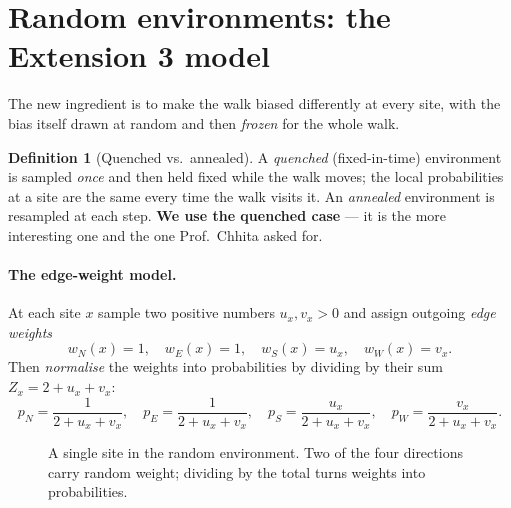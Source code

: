 \documentclass[11pt]{article}
\theoremstyle{definition}
\newtheorem{definition}{Definition}[section]
\theoremstyle{plain}
\begin{document}
\section{Random environments: the Extension 3 model}

The new ingredient is to make the walk biased differently at every site, with
the bias itself drawn at random and then \emph{frozen} for the whole walk.

\begin{definition}[Quenched vs.\ annealed]
A \emph{quenched} (fixed-in-time) environment is sampled \emph{once} and then
held fixed while the walk moves; the local probabilities at a site are the same
every time the walk visits it. An \emph{annealed} environment is resampled at
each step. \textbf{We use the quenched case} --- it is the more interesting one
and the one Prof.\ Chhita asked for.
\end{definition}

\paragraph{The edge-weight model.}
At each site $x$ sample two positive numbers $u_x,v_x>0$ and assign outgoing
\emph{edge weights}
\[
   w_N(x)=1,\quad w_E(x)=1,\quad w_S(x)=u_x,\quad w_W(x)=v_x .
\]
Then \emph{normalise} the weights into probabilities by dividing by their sum
$Z_x=2+u_x+v_x$:
\[
   p_N=\frac{1}{2+u_x+v_x},\quad
   p_E=\frac{1}{2+u_x+v_x},\quad
   p_S=\frac{u_x}{2+u_x+v_x},\quad
   p_W=\frac{v_x}{2+u_x+v_x}.
\]

\begin{figure}[h]
\centering
{}
\caption{A single site in the random environment. Two of the four directions
carry random weight; dividing by the total turns weights into probabilities.}
\label{fig:weighted-site}
\end{figure}
\end{document}
